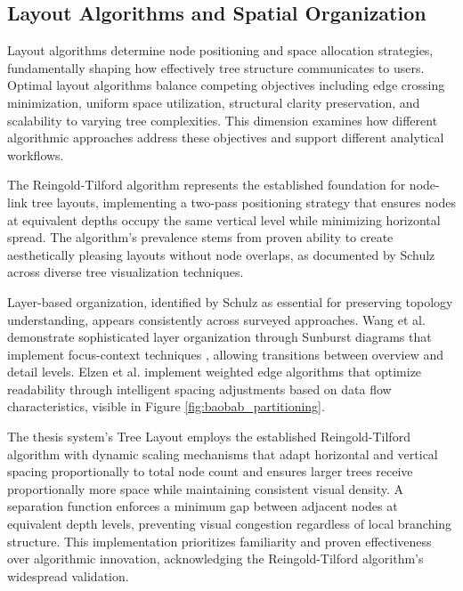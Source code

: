 \subsection{Layout Algorithms and Spatial Organization}

Layout algorithms determine node positioning and space allocation strategies, fundamentally shaping how effectively tree structure communicates to users. Optimal layout algorithms balance competing objectives including edge crossing minimization, uniform space utilization, structural clarity preservation, and scalability to varying tree complexities. This dimension examines how different algorithmic approaches address these objectives and support different analytical workflows.

The Reingold-Tilford algorithm \cite{1702828} represents the established foundation for node-link tree layouts, implementing a two-pass positioning strategy that ensures nodes at equivalent depths occupy the same vertical level while minimizing horizontal spread. The algorithm's prevalence stems from proven ability to create aesthetically pleasing layouts without node overlaps, as documented by Schulz \cite{schulz2011treevis} across diverse tree visualization techniques.

Layer-based organization, identified by Schulz \cite{schulz2011treevis} as essential for preserving topology understanding, appears consistently across surveyed approaches. Wang et al. \cite{wang2022timbertrek} demonstrate sophisticated layer organization through Sunburst diagrams that implement focus-context techniques \cite{readingsInformationVi}, allowing transitions between overview and detail levels. Elzen et al. \cite{elzen2011baobabview} implement weighted edge algorithms that optimize readability through intelligent spacing adjustments based on data flow characteristics, visible in Figure \ref{fig:baobab_partitioning}.

The thesis system's Tree Layout employs the established Reingold-Tilford algorithm with dynamic scaling mechanisms that adapt horizontal and vertical spacing proportionally to total node count and ensures larger trees receive proportionally more space while maintaining consistent visual density. A separation function enforces a minimum gap between adjacent nodes at equivalent depth levels, preventing visual congestion regardless of local branching structure. This implementation prioritizes familiarity and proven effectiveness over algorithmic innovation, acknowledging the Reingold-Tilford algorithm's widespread validation.

